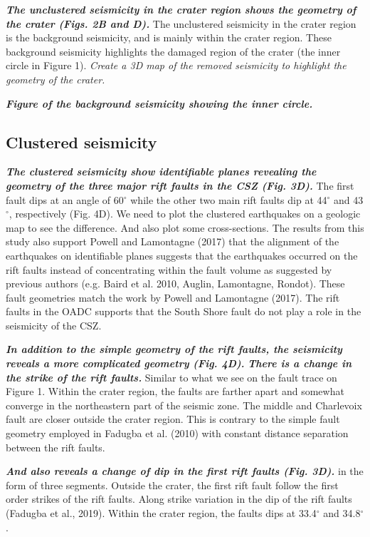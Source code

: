 \documentclass[draft]{agujournal2018}
\begin{document}
\textit{\textbf{The unclustered seismicity in the crater region shows the geometry of the crater (Figs. 2B and D).}} The unclustered seismicity in the crater region is the background seismicity, and is mainly within the crater region. These background seismicity highlights the damaged region of the crater (the inner circle in Figure 1). \textit{Create a 3D map of the removed seismicity to highlight the geometry of the crater.}

\textbf{\textit{Figure of the background seismicity showing the inner circle.}}
 



\subsection{Clustered seismicity}
\textit{\textbf{The clustered seismicity show identifiable planes revealing the geometry of the three major rift faults in the CSZ (Fig. 3D).}} The first fault dips at an angle of 60$^\circ$ while the other two main rift faults dip at 44$^\circ$ and 43$^\circ$, respectively (Fig. 4D). We need to plot the clustered earthquakes on a geologic map to see the difference. And also plot some cross-sections. The results from this study also support Powell and Lamontagne (2017) that the alignment of the earthquakes on identifiable planes suggests that the earthquakes occurred on the rift faults instead of concentrating within the fault volume as suggested by previous authors (e.g. Baird et al. 2010, Auglin, Lamontagne, Rondot). These fault geometries match the work by Powell and Lamontagne (2017). The rift faults in the OADC supports that the South Shore fault do not play a role in the seismicity of the CSZ.

\textit{\textbf{In addition to the simple geometry of the rift faults, the seismicity reveals a more complicated geometry (Fig. 4D).}} \textit{\textbf{There is a change in the strike of the rift faults.}} Similar to what we see on the fault trace on Figure 1. Within the crater region, the faults are farther apart and somewhat converge in the northeastern part of the seismic zone. The middle and Charlevoix fault are closer outside the crater region. This is contrary to the simple fault geometry employed in Fadugba et al. (2010) with constant distance separation between the rift faults.

\textit{\textbf{And also reveals a change of dip in the first rift faults (Fig. 3D).}} in the form of three segments. Outside the crater, the first rift fault follow the first order strikes of the rift faults. Along strike variation in the dip of the rift faults (Fadugba et al., 2019). Within the crater region, the faults dips at 33.4$^\circ$ and 34.8$^\circ$.
\end{document}
